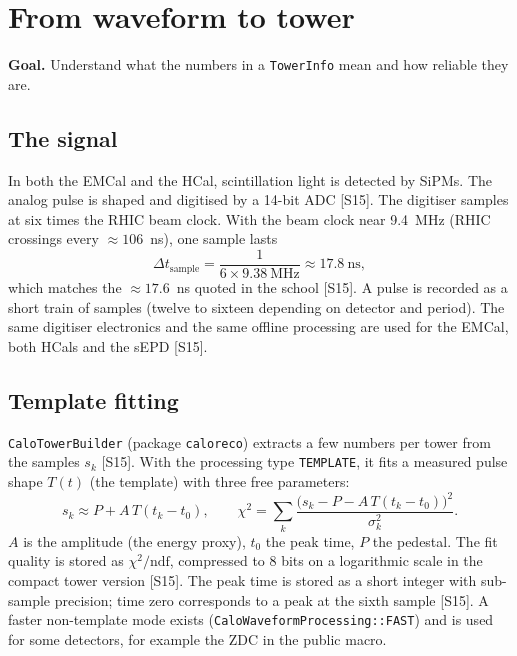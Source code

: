 \documentclass[11pt,letterpaper]{article}
\newcommand{\goal}[1]{\par\noindent\textbf{Goal.} #1\par}
\begin{document}
\section{From waveform to tower}
\goal{Understand what the numbers in a \texttt{TowerInfo} mean and how reliable they are.}

\subsection{The signal}
In both the EMCal and the HCal, scintillation light is detected by SiPMs. The analog pulse is shaped and digitised by a 14-bit ADC [S15].
The digitiser samples at six times the RHIC beam clock. With the beam clock near 9.4~MHz (RHIC crossings every $\approx106$~ns), one sample lasts
\begin{equation}
\Delta t_{\mathrm{sample}} = \frac{1}{6\times 9.38\ \mathrm{MHz}} \approx 17.8\ \mathrm{ns},
\end{equation}
which matches the $\approx17.6$~ns quoted in the school [S15]. A pulse is recorded as a short train of samples (twelve to sixteen depending on detector and period).
The same digitiser electronics and the same offline processing are used for the EMCal, both HCals and the sEPD [S15].

\subsection{Template fitting}
\texttt{CaloTowerBuilder} (package \texttt{caloreco}) extracts a few numbers per tower from the samples $s_k$ [S15]. With the processing type \texttt{TEMPLATE},
it fits a measured pulse shape $T(t)$ (the template) with three free parameters:
\begin{equation}
s_k \approx P + A\,T(t_k - t_0), \qquad
\chi^2 = \sum_k \frac{\big(s_k - P - A\,T(t_k-t_0)\big)^2}{\sigma_k^2}.
\end{equation}
$A$ is the amplitude (the energy proxy), $t_0$ the peak time, $P$ the pedestal.
The fit quality is stored as $\chi^2/\mathrm{ndf}$, compressed to 8 bits on a logarithmic scale in the compact tower version [S15].
The peak time is stored as a short integer with sub-sample precision; time zero corresponds to a peak at the sixth sample [S15].
A faster non-template mode exists (\texttt{CaloWaveformProcessing::FAST}) and is used for some detectors, for example the ZDC in the public macro.
\end{document}
